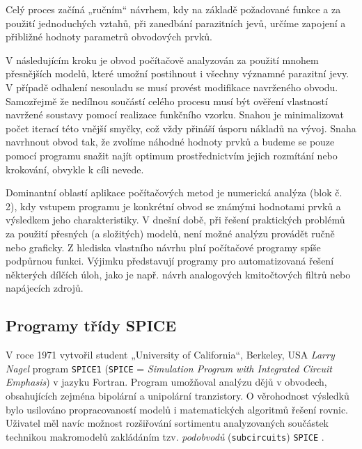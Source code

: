       Celý proces začíná „ručním“ návrhem, kdy na základě požadované funkce a za použití
      jednoduchých vztahů, při zanedbání parazitních jevů, určíme zapojení a přibližné hodnoty
      parametrů obvodových prvků. 
      
      V následujícím kroku je obvod počítačově analyzován za použití mnohem přesnějších modelů,
      které umožní postihnout i všechny významné parazitní jevy. V případě odhalení nesouladu se
      musí provést modifikace navrženého obvodu. Samozřejmě že nedílnou součástí celého procesu musí
      být ověření vlastností navržené soustavy pomocí realizace funkčního vzorku. Snahou je
      minimalizovat počet iterací této vnější smyčky, což vždy přináší úsporu nákladů na vývoj.
      Snaha navrhnout obvod tak, že zvolíme náhodné hodnoty prvků a budeme se pouze pomocí programu
      snažit najít optimum prostřednictvím jejich rozmítání nebo krokování, obvykle k cíli nevede. 
      
      Dominantní oblastí aplikace počítačových metod je numerická analýza (blok č. 2), kdy vstupem
      programu je konkrétní obvod se známými hodnotami prvků a výsledkem jeho charakteristiky. V
      dnešní době, při řešení praktických problémů za použití přesných (a složitých) modelů, není
      možné analýzu provádět ručně nebo graficky. Z hlediska vlastního návrhu plní počítačové
      programy spíše podpůrnou funkci. Výjimku představují programy pro automatizovaná řešení
      některých dílčích úloh, jako je např. návrh analogových kmitočtových filtrů nebo napájecích
      zdrojů.

    \subsection{Programy třídy SPICE}
      V roce 1971 vytvořil student „University of California“, Berkeley, USA \emph{Larry Nagel}
      program \texttt{SPICE1} (\texttt{SPICE} = \emph{Simulation Program with Integrated Circuit
      Emphasis}) v jazyku Fortran. Program umožňoval analýzu dějů v obvodech, obsahujících zejména
      bipolární a unipolární tranzistory. O věrohodnost výsledků bylo usilováno propracovaností
      modelů i matematických algoritmů řešení rovnic. Uživatel měl navíc  možnost
      roz\-ši\-řo\-vá\-ní sortimentu analyzovaných součástek technikou makromodelů zakládáním tzv.
      \emph{pod\-ob\-vo\-dů} (\texttt{subcircuits}) \texttt{SPICE} \cite[s.~2]{KolkaBiolek2011}. 
      
